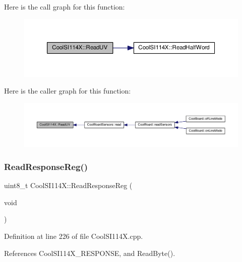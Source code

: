 Here is the call graph for this function\+:
\nopagebreak
\begin{figure}[H]
\begin{center}
\leavevmode
\includegraphics[width=350pt]{dd/d67/class_cool_s_i114_x_a14ced664d74e93438440b0274109c111_cgraph}
\end{center}
\end{figure}
Here is the caller graph for this function\+:
\nopagebreak
\begin{figure}[H]
\begin{center}
\leavevmode
\includegraphics[width=350pt]{dd/d67/class_cool_s_i114_x_a14ced664d74e93438440b0274109c111_icgraph}
\end{center}
\end{figure}
\mbox{\label{class_cool_s_i114_x_a869d3825147831d707f7ef324a665646}} 
\subsubsection{\texorpdfstring{Read\+Response\+Reg()}{ReadResponseReg()}}
{\footnotesize\ttfamily uint8\+\_\+t Cool\+S\+I114\+X\+::\+Read\+Response\+Reg (\begin{DoxyParamCaption}\item[{void}]{ }\end{DoxyParamCaption})}



Definition at line 226 of file Cool\+S\+I114\+X.\+cpp.



References Cool\+S\+I114\+X\+\_\+\+R\+E\+S\+P\+O\+N\+SE, and Read\+Byte().



